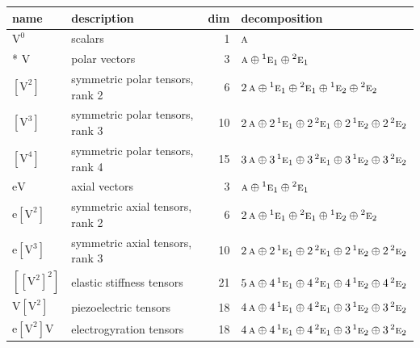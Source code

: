 \documentclass[10pt,a4paper]{article}
\numberwithin{equation}{section}
\newcommand{\irr}[1]{\text{\normalfont\scshape #1}}
\newcommand{\conjpair}[1]{{}^{#1}}
\newcommand{\jahn}[1]{\mathrm{#1}}
\newlength{\fillwidth}\newlength{\cellwidth}\newlength{\colwidth}
\begin{document}
{\begin{longtable}{@{}llr>{\RaggedRight\arraybackslash}p{\fillwidth}@{}}
name & description & dim & decomposition\\\midrule\endhead
\bottomrule\endfoot\endlastfoot
$\jahn{V^{0}}$ & scalars & 1 & $\irr{a}$\\*
$\jahn{V}$ & polar vectors & 3 & $\irr{a} \oplus\allowbreak \conjpair{1}\irr{e}_{1} \oplus\allowbreak \conjpair{2}\irr{e}_{1}$\\
$\jahn{[V^{2}]}$ & symmetric polar tensors, rank 2 & 6 & $2\,\irr{a} \oplus\allowbreak \conjpair{1}\irr{e}_{1} \oplus\allowbreak \conjpair{2}\irr{e}_{1} \oplus\allowbreak \conjpair{1}\irr{e}_{2} \oplus\allowbreak \conjpair{2}\irr{e}_{2}$\\
$\jahn{[V^{3}]}$ & symmetric polar tensors, rank 3 & 10 & $2\,\irr{a} \oplus\allowbreak 2\,\conjpair{1}\irr{e}_{1} \oplus\allowbreak 2\,\conjpair{2}\irr{e}_{1} \oplus\allowbreak 2\,\conjpair{1}\irr{e}_{2} \oplus\allowbreak 2\,\conjpair{2}\irr{e}_{2}$\\
$\jahn{[V^{4}]}$ & symmetric polar tensors, rank 4 & 15 & $3\,\irr{a} \oplus\allowbreak 3\,\conjpair{1}\irr{e}_{1} \oplus\allowbreak 3\,\conjpair{2}\irr{e}_{1} \oplus\allowbreak 3\,\conjpair{1}\irr{e}_{2} \oplus\allowbreak 3\,\conjpair{2}\irr{e}_{2}$\\
$\jahn{eV}$ & axial vectors & 3 & $\irr{a} \oplus\allowbreak \conjpair{1}\irr{e}_{1} \oplus\allowbreak \conjpair{2}\irr{e}_{1}$\\
$\jahn{e[V^{2}]}$ & symmetric axial tensors, rank 2 & 6 & $2\,\irr{a} \oplus\allowbreak \conjpair{1}\irr{e}_{1} \oplus\allowbreak \conjpair{2}\irr{e}_{1} \oplus\allowbreak \conjpair{1}\irr{e}_{2} \oplus\allowbreak \conjpair{2}\irr{e}_{2}$\\
$\jahn{e[V^{3}]}$ & symmetric axial tensors, rank 3 & 10 & $2\,\irr{a} \oplus\allowbreak 2\,\conjpair{1}\irr{e}_{1} \oplus\allowbreak 2\,\conjpair{2}\irr{e}_{1} \oplus\allowbreak 2\,\conjpair{1}\irr{e}_{2} \oplus\allowbreak 2\,\conjpair{2}\irr{e}_{2}$\\
$\jahn{[[V^{2}]^{2}]}$ & elastic stiffness tensors & 21 & $5\,\irr{a} \oplus\allowbreak 4\,\conjpair{1}\irr{e}_{1} \oplus\allowbreak 4\,\conjpair{2}\irr{e}_{1} \oplus\allowbreak 4\,\conjpair{1}\irr{e}_{2} \oplus\allowbreak 4\,\conjpair{2}\irr{e}_{2}$\\
$\jahn{V[V^{2}]}$ & piezoelectric tensors & 18 & $4\,\irr{a} \oplus\allowbreak 4\,\conjpair{1}\irr{e}_{1} \oplus\allowbreak 4\,\conjpair{2}\irr{e}_{1} \oplus\allowbreak 3\,\conjpair{1}\irr{e}_{2} \oplus\allowbreak 3\,\conjpair{2}\irr{e}_{2}$\\
$\jahn{e[V^{2}]V}$ & electrogyration tensors & 18 & $4\,\irr{a} \oplus\allowbreak 4\,\conjpair{1}\irr{e}_{1} \oplus\allowbreak 4\,\conjpair{2}\irr{e}_{1} \oplus\allowbreak 3\,\conjpair{1}\irr{e}_{2} \oplus\allowbreak 3\,\conjpair{2}\irr{e}_{2}$\\

\end{longtable}}
\end{document}
